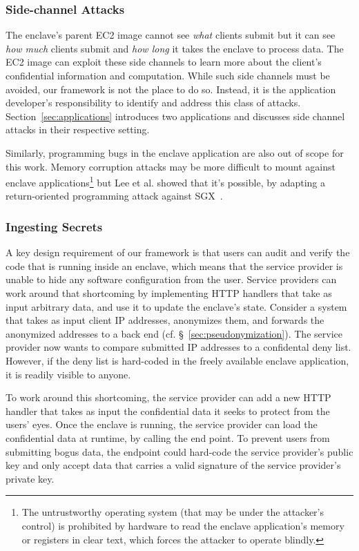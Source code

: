 \subsubsection{Side-channel Attacks}
\label{sec:side-channels}

The enclave's parent EC2 image cannot see \emph{what} clients submit but it can
see \emph{how much} clients submit and \emph{how long} it takes the enclave to
process data.  The EC2 image can exploit these side channels to learn more
about the client's confidential information and computation.  While such side
channels must be avoided, our framework is not the place to do so.  Instead, it
is the application developer's responsibility to identify and address this class of
attacks.  Section~\ref{sec:applications} introduces two applications and
discusses side channel attacks in their respective setting.

Similarly, programming bugs in the enclave application are also out of scope for
this work.  Memory corruption attacks may be more difficult to mount against
enclave applications\footnote{The untrustworthy operating system (that may be
under the attacker's control) is prohibited by hardware to read the enclave
application's memory or registers in clear text, which forces the attacker to
operate blindly.} but Lee et al. showed that it's possible, by adapting a
return-oriented programming attack against SGX~\cite{Lee2017a}.

\subsubsection{Ingesting Secrets}
\label{sec:secrets}

A key design requirement of our framework is that users can audit and verify the
code that is running inside an enclave, which means that the service provider is
unable to hide any software configuration from the user.  Service providers can
work around that shortcoming by implementing HTTP handlers that take as input
arbitrary data, and use it to update the enclave's state.  Consider a system
that takes as input client IP addresses, anonymizes them, and forwards the
anonymized addresses to a back end (cf. \S~\ref{sec:pseudonymization}).  The
service provider now wants to compare submitted IP addresses to a confidental
deny list.  However, if the deny list is hard-coded in the freely available
enclave application, it is readily visible to anyone.

To work around this shortcoming, the service provider can add a new HTTP handler
that takes as input the confidential data it seeks to protect from the users'
eyes.  Once the enclave is running, the service provider can load the
confidential data at runtime, by calling the end point.  To prevent users from
submitting bogus data, the endpoint could hard-code the service provider's
public key and only accept data that carries a valid signature of the service
provider's private key.


